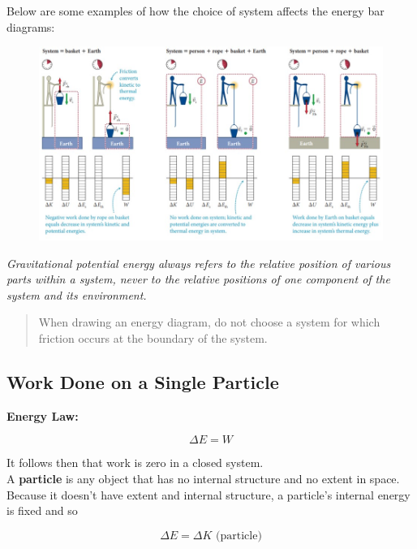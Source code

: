         Below are some examples of how the choice of system affects the energy bar diagrams:

        \begin{figure}[hbt!]
            \centering
            \includegraphics[]{Resources/System_work}
        \end{figure}

        \textit{Gravitational potential energy always refers to the relative position of various parts within a system, never to the relative positions of one component of the system and its environment.} \\

        \color{blue}
        \begin{quote}
            When drawing an energy diagram, do not choose a system for which friction occurs at the boundary of the system.
        \end{quote}
        \color{black}

    \subsection{Work Done on a Single Particle}

        \textbf{Energy Law:}

        \[
            \Delta E = W
        \]

        It follows then that work is zero in a closed system. \\

        A \textbf{particle} is any object that has no internal structure and no extent in space. Because it doesn't have extent and internal structure, a particle's internal energy is fixed and so

        \[
            \Delta E = \Delta K \text{ (particle)}
        \]

